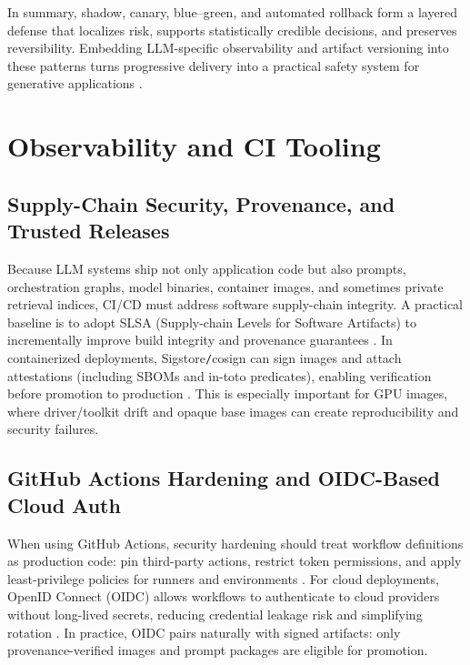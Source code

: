 \medskip
In summary, shadow, canary, blue--green, and automated rollback form a layered defense that localizes risk, supports statistically credible decisions, and preserves reversibility. Embedding LLM-specific observability and artifact versioning into these patterns turns progressive delivery into a practical safety system for generative applications \cite{rohan_llmops,mlflow_llm_eval,phoenix_rag,trulens}.

\section{Observability and CI Tooling}
\label{sec:cicd-observability-ci}
\subsection{Supply-Chain Security, Provenance, and Trusted Releases}
Because LLM systems ship not only application code but also prompts, orchestration graphs, model binaries, container images, and sometimes private retrieval indices, CI/CD must address software supply-chain integrity. A practical baseline is to adopt SLSA (Supply-chain Levels for Software Artifacts) to incrementally improve build integrity and provenance guarantees \cite{slsa_levels}. In containerized deployments, Sigstore\texttt{/}cosign can sign images and attach attestations (including SBOMs and in-toto predicates), enabling verification before promotion to production \cite{sigstore_cosign,cosign_attestations}. This is especially important for GPU images, where driver/toolkit drift and opaque base images can create reproducibility and security failures.

\subsection{GitHub Actions Hardening and OIDC-Based Cloud Auth}
When using GitHub Actions, security hardening should treat workflow definitions as production code: pin third-party actions, restrict token permissions, and apply least-privilege policies for runners and environments \cite{gha_secure_use,gha_security}. For cloud deployments, OpenID Connect (OIDC) allows workflows to authenticate to cloud providers without long-lived secrets, reducing credential leakage risk and simplifying rotation \cite{gha_oidc_concepts,gha_oidc_cloud}. In practice, OIDC pairs naturally with signed artifacts: only provenance-verified images and prompt packages are eligible for promotion.

